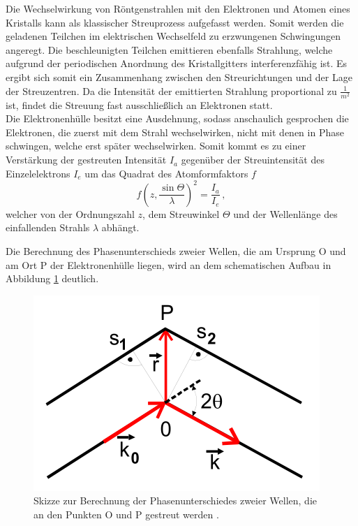 Die Wechselwirkung von Röntgenstrahlen mit den Elektronen und Atomen eines Kristalls kann als klassischer Streuprozess aufgefasst werden.
Somit werden die geladenen Teilchen im elektrischen Wechselfeld zu erzwungenen Schwingungen angeregt.
Die beschleunigten Teilchen emittieren ebenfalls Strahlung, welche aufgrund der periodischen Anordnung des Kristallgitters interferenzfähig ist.
Es ergibt sich somit ein Zusammenhang zwischen den Streurichtungen und der Lage der Streuzentren.
Da die Intensität der emittierten Strahlung proportional zu $\frac{1}{m^2}$ ist, findet die Streuung fast ausschließlich an Elektronen statt.
\\
Die Elektronenhülle besitzt eine Ausdehnung, sodass anschaulich gesprochen die Elektronen, die zuerst mit dem Strahl wechselwirken, nicht mit denen in Phase schwingen, welche erst später wechselwirken.
Somit kommt es zu einer Verstärkung der gestreuten Intensität $I_a$ gegenüber der Streuintensität des Einzelelektrons $I_e$ um das
Quadrat des Atomformfaktors $f$
\begin{equation*}
    f\left(z, \frac{\sin{\Theta}}{\lambda}\right)^2 = \frac{I_a}{I_e}\,,
\end{equation*}
welcher von der Ordnungszahl $z$, dem Streuwinkel $\Theta$ und der Wellenlänge des einfallenden Strahls $\lambda$ abhängt.

Die Berechnung des Phasenunterschieds zweier Wellen, die am Ursprung O und am Ort P der Elektronenhülle liegen, wird an dem schematischen Aufbau in Abbildung \ref{fig:phase} deutlich.
\begin{figure}[h!]
    \centering
    \includegraphics[width=0.5\linewidth]{images/phase.png}
    \caption{Skizze zur Berechnung der Phasenunterschiedes zweier Wellen, die an den Punkten O und P gestreut werden \cite{V41}.}
    \label{fig:phase}
\end{figure}


